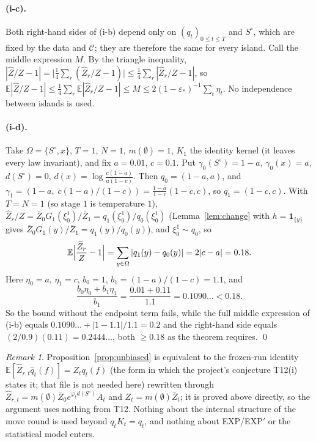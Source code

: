 \documentclass[11pt]{article}
\theoremstyle{remark}
\newtheorem{remark}[theorem]{Remark}
\newcommand{\E}{\mathbb{E}}
\newcommand{\Om}{\Omega}
\newcommand{\qh}{\widehat q}
\newcommand{\Zh}{\widehat Z}
\newcommand{\Zb}{\bar Z}
\newcommand{\So}{S^{\circ}}
\begin{document}
\paragraph{(i-c).} Both right-hand sides of (i-b) depend only on $(q_t)_{0\le t\le T}$ and $\So$, which are fixed by the
data and $\mathcal C$; they are therefore the same for every island. Call the middle expression $M$. By the triangle inequality,
$|\Zh/Z-1|=\bigl|\tfrac14\sum_r(\Zh_r/Z-1)\bigr|\le\tfrac14\sum_r|\Zh_r/Z-1|$, so
$\E|\Zh/Z-1|\le\tfrac14\sum_r\E|\Zh_r/Z-1|\le M\le 2(1-\varepsilon_*)^{-1}\sum_t\eta_t$. No independence between islands
is used.

\paragraph{(i-d).} Take $\Om=\{\So,x\}$, $T=1$, $N=1$, $m(\emptyset)=1$, $K_1$ the identity kernel (it leaves every law
invariant), and fix $a=0.01$, $c=0.1$. Put $\gamma_0(\So)=1-a$, $\gamma_0(x)=a$, $d(\So)=0$,
$d(x)=\log\frac{c(1-a)}{a(1-c)}$. Then $q_0=(1-a,a)$, and $\gamma_1=(1-a,\;c(1-a)/(1-c))=\frac{1-a}{1-c}(1-c,c)$, so
$q_1=(1-c,c)$. With $T=N=1$ (so stage $1$ is temperature $1$), $\Zh_r/Z=\Zb_0G_1(\xi_0^1)/\Zb_1=q_1(\xi_0^1)/q_0(\xi_0^1)$ (Lemma~\ref{lem:change} with
$h=\mathbf 1_{\{y\}}$ gives $\Zb_0 G_1(y)/\Zb_1=q_1(y)/q_0(y)$), and $\xi_0^1\sim q_0$, so
\[
\E\Bigl|\frac{\Zh_r}{Z}-1\Bigr|=\sum_{y\in\Om}|q_1(y)-q_0(y)|=2|c-a|=0.18 .
\]
Here $\eta_0=a$, $\eta_1=c$, $b_0=1$, $b_1=(1-a)/(1-c)=1.1$, and
\[
\frac{b_0\eta_0+b_1\eta_1}{b_1}=\frac{0.01+0.11}{1.1}=0.1090\ldots<0.18 .
\]
So the bound without the endpoint term fails, while the full middle expression of (i-b) equals
$0.1090\ldots+|1-1.1|/1.1=0.2$ and the right-hand side equals $(2/0.9)(0.11)=0.2444\ldots$, both $\ge0.18$ as the theorem
requires. \qed

\begin{remark}
Proposition~\ref{prop:unbiased} is equivalent to the frozen-run identity $\E[\Zh_{r,t}\qh_t(f)]=Z_tq_t(f)$ (the form in
which the project's conjecture T12(i) states it; that file is not needed here) rewritten through
$\Zh_{r,t}=m(\emptyset)\Zb_0e^{\varphi_td(\So)}A_t$ and $Z_t=m(\emptyset)\Zb_t$; it is proved above directly, so the
argument uses nothing from T12. Nothing about the internal structure of the move round is used beyond $q_tK_t=q_t$, and
nothing about EXP/EXP$'$ or the statistical model enters.
\end{remark}
\end{document}
